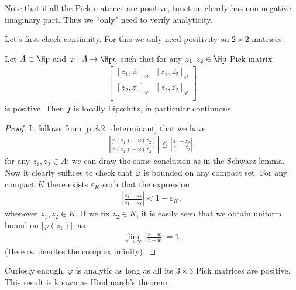 Note that if all the Pick matrices are positive, function clearly has non-negative imaginary part. Thus we ``only" need to verify analyticity.

Let's first check continuity. For this we only need positivity on $2 \times 2$-matrices.

\begin{lause}\label{pick_continuity_lemma}
	Let $A \subset \Hp$ and $\varphi : A \to \Hpc$ such that for any $z_{1}, z_{2} \in \Hp$ Pick matrix
	\begin{align*}
	\begin{bmatrix}
		[z_{1}, \overline{z_{1}}]_{\varphi} & [z_{1}, \overline{z_{2}}]_{\varphi}\\
		[z_{2}, \overline{z_{1}}]_{\varphi} & [z_{2}, \overline{z_{2}}]_{\varphi}\\
	\end{bmatrix}
	\end{align*}
	is positive. Then $f$ is locally Lipschitz, in particular continuous.
\end{lause}
\begin{proof}
	It follows from \ref{pick2_determinant} that we have
	\begin{align*}
		\left|\frac{\varphi(z_{1}) - \varphi(z_{2})}{\varphi(z_{1}) - \overline{\varphi(z_{2})}} \right| \leq \left|\frac{z_{1} - z_{2}}{z_{1} - \overline{z_{2}}} \right|.
	\end{align*}
	for any $z_{1}, z_{2} \in A$; we can draw the same conclusion as in the Schwarz lemma. Now it clearly suffices to check that $\varphi$ is bounded on any compact set. For any compact $K$ there exists $\varepsilon_{K}$ such that the expression
	\begin{align*}
		\left|\frac{z_{1} - z_{2}}{z_{1} - \overline{z_{2}}} \right| < 1 - \varepsilon_{K},
	\end{align*}
	whenever $z_{1}, z_{2} \in K$. If we fix $z_{2} \in K$, it is easily seen that we obtain uniform bound on $|\varphi(z_{1})|$, as
	\begin{align*}
		\lim_{z \to \infty}  \left|\frac{z - w}{z - \overline{w}} \right| = 1.
	\end{align*}
	(Here $\infty$ denotes the complex infinity).
\end{proof}

Curiosly enough, $\varphi$ is analytic as long as all its $3 \times 3$ Pick matrices are positive. This result is known as Hindmarsh's theorem.

